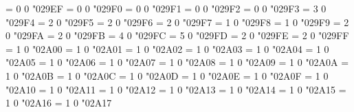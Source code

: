 \Umathchardef\errbarblacksquare = 0 0 "029EF %
\Umathchardef\errbardiamond = 0 0 "029F0 %
\Umathchardef\errbarblackdiamond = 0 0 "029F1 %
\Umathchardef\errbarcircle = 0 0 "029F2 %
\Umathchardef\errbarblackcircle = 0 0 "029F3 %
\Umathchardef{} = 3 0 "029F4 %
\Umathchardef\reversesolidus = 2 0 "029F5 %
\Umathchardef\dsol = 2 0 "029F6 %
\Umathchardef\rsolbar = 2 0 "029F7 %
\Umathchardef\xsol = 1 0 "029F8 %
\Umathchardef\xbsol = 1 0 "029F9 %
\Umathchardef\doubleplus = 2 0 "029FA %
\Umathchardef\tripleplus = 2 0 "029FB %
\Umathchardef\lcurvyangle = 4 0 "029FC %
\Umathchardef\rcurvyangle = 5 0 "029FD %
\Umathchardef\tplus = 2 0 "029FE %
\Umathchardef\tminus = 2 0 "029FF %
\Umathchardef\bigodot = 1 0 "02A00 %
\Umathchardef\bigoplus = 1 0 "02A01 %
\Umathchardef\bigotimes = 1 0 "02A02 %
\Umathchardef\bigcupdot = 1 0 "02A03 %
\Umathchardef\biguplus = 1 0 "02A04 %
\Umathchardef\bigsqcap = 1 0 "02A05 %
\Umathchardef\bigsqcup = 1 0 "02A06 %
\Umathchardef\conjquant = 1 0 "02A07 %
\Umathchardef\disjquant = 1 0 "02A08 %
\Umathchardef\bigtimes = 1 0 "02A09 %
\Umathchardef\modtwosum = 1 0 "02A0A %
\Umathchardef\sumint = 1 0 "02A0B %
\Umathchardef\iiiint = 1 0 "02A0C %
\Umathchardef\intbar = 1 0 "02A0D %
\Umathchardef\intBar = 1 0 "02A0E %
\Umathchardef\fint = 1 0 "02A0F %
\Umathchardef\cirfnint = 1 0 "02A10 %
\Umathchardef\awint = 1 0 "02A11 %
\Umathchardef\rppolint = 1 0 "02A12 %
\Umathchardef\scpolint = 1 0 "02A13 %
\Umathchardef\npolint = 1 0 "02A14 %
\Umathchardef\pointint = 1 0 "02A15 %
\Umathchardef\sqint = 1 0 "02A16 %
\Umathchardef\intlarhk = 1 0 "02A17 %

